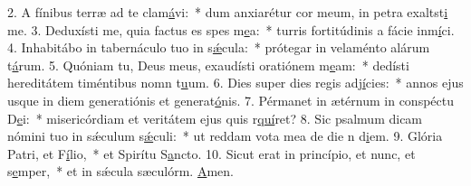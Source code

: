 2. A fínibus terræ ad te clam\uline{á}vi:~* dum anxiarétur cor meum, in petra exaltst\uline{i} me.
3. Deduxísti me, quia factus es spes m\uline{e}a:~* turris fortitúdinis a fácie inm\uline{í}ci.
4. Inhabitábo in tabernáculo tuo in s\uline{ǽ}cula:~* prótegar in velaménto alárum t\uline{á}rum.
5. Quóniam tu, Deus meus, exaudísti oratiónem m\uline{e}am:~* dedísti hereditátem timéntibus nomn t\uline{u}um.
6. Dies super dies regis adj\uline{í}cies:~* annos ejus usque in diem generatiónis et generat\uline{ó}nis.
7. Pérmanet in ætérnum in conspéctu D\uline{e}i:~* misericórdiam et veritátem ejus quis r\uline{quí}ret?
8. Sic psalmum dicam nómini tuo in sǽculum s\uline{ǽ}culi:~* ut reddam vota mea de die n d\uline{i}em.
9. Glória Patri, et F\uline{í}lio,~* et Spirítu S\uline{a}ncto.
10. Sicut erat in princípio, et nunc, et s\uline{e}mper,~* et in sǽcula sæculórm. \uline{A}men.

